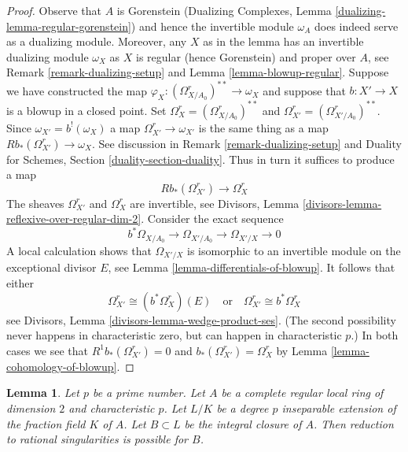 \documentclass{stacks-project}
\theoremstyle{plain}
\newtheorem{lemma}[subsection]{Lemma}
\theoremstyle{definition}
\theoremstyle{remark}
\numberwithin{equation}{subsection}
\begin{document}
\begin{proof}
Observe that $A$ is Gorenstein (Dualizing Complexes,
Lemma \ref{dualizing-lemma-regular-gorenstein})
and hence the invertible module $\omega_A$ does indeed serve
as a dualizing module. Moreover, any $X$ as in the lemma
has an invertible dualizing module $\omega_X$ as $X$ is regular
(hence Gorenstein) and proper over $A$, see
Remark \ref{remark-dualizing-setup} and
Lemma \ref{lemma-blowup-regular}.
Suppose we have constructed the map
$\varphi_X : (\Omega^r_{X/A_0})^{**} \to \omega_X$
and suppose that $b : X' \to X$ is a blowup in a closed point.
Set $\Omega^r_X = (\Omega^r_{X/A_0})^{**}$ and
$\Omega^r_{X'} = (\Omega^r_{X'/A_0})^{**}$. Since $\omega_{X'} = b^!(\omega_X)$
a map $\Omega^r_{X'} \to \omega_{X'}$ is the same thing as a map
$Rb_*(\Omega^r_{X'}) \to \omega_X$. See discussion in
Remark \ref{remark-dualizing-setup} and
Duality for Schemes, Section \ref{duality-section-duality}.
Thus in turn it suffices to produce a map
$$
Rb_*(\Omega^r_{X'}) \longrightarrow \Omega^r_X
$$
The sheaves $\Omega^r_{X'}$ and $\Omega^r_X$ are invertible, see
Divisors, Lemma \ref{divisors-lemma-reflexive-over-regular-dim-2}.
Consider the exact sequence
$$
b^*\Omega_{X/A_0} \to \Omega_{X'/A_0} \to \Omega_{X'/X} \to 0
$$
A local calculation shows that $\Omega_{X'/X}$ is isomorphic
to an invertible module on the exceptional divisor $E$, see
Lemma \ref{lemma-differentials-of-blowup}. It follows that
either
$$
\Omega^r_{X'} \cong (b^*\Omega^r_X)(E)
\quad\text{or}\quad
\Omega^r_{X'} \cong b^*\Omega^r_X
$$
see Divisors, Lemma \ref{divisors-lemma-wedge-product-ses}.
(The second possibility never happens in characteristic zero, but
can happen in characteristic $p$.) In both cases we see that
$R^1b_*(\Omega^r_{X'}) = 0$ and $b_*(\Omega^r_{X'}) = \Omega^r_X$ by
Lemma \ref{lemma-cohomology-of-blowup}.
\end{proof}

\begin{lemma}
\label{lemma-go-up-degree-p}
Let $p$ be a prime number. Let $A$ be a complete regular local ring of
dimension $2$ and characteristic $p$. Let $L/K$ be a degree $p$ inseparable
extension of the fraction field $K$ of $A$. Let $B \subset L$ be the integral
closure of $A$. Then reduction to rational singularities is possible for $B$.
\end{lemma}
\end{document}
